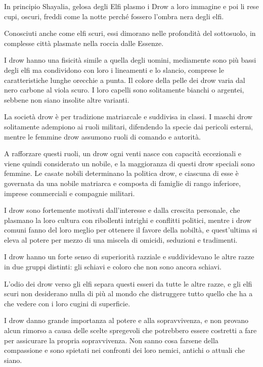 \documentclass[a4paper,11pt,twoside,openany]{book}
\begin{document}
In principio Shayalia, gelosa degli Elfi plasmo i Drow a loro immagine e poi li rese cupi, oscuri, freddi come la notte perché fossero l'ombra nera degli elfi.

Conosciuti anche come elfi scuri, essi dimorano nelle profondità del sottosuolo, in complesse città plasmate nella roccia dalle Essenze.

I drow hanno una fisicità simile a quella degli uomini, mediamente sono più bassi degli elfi ma condividono con loro i lineamenti e lo slancio, comprese le caratteristiche lunghe orecchie a punta. Il colore della pelle dei drow varia dal nero carbone al viola scuro. I loro capelli sono solitamente bianchi o argentei, sebbene non siano insolite altre varianti.

La società drow è per tradizione matriarcale e suddivisa in classi. I maschi drow solitamente adempiono ai ruoli militari, difendendo la specie dai pericoli esterni, mentre le femmine drow assumono ruoli di comando e autorità.

A rafforzare questi ruoli, un drow ogni venti nasce con capacità eccezionali e viene quindi considerato un nobile, e la maggioranza di questi drow speciali sono femmine. Le casate nobili determinano la politica drow, e ciascuna di esse è governata da una nobile matriarca e composta di famiglie di rango inferiore, imprese commerciali e compagnie militari.

I drow sono fortemente motivati dall'interesse e dalla crescita personale, che plasmano la loro cultura con ribollenti intrighi e conflitti politici, mentre i drow comuni fanno del loro meglio per ottenere il favore della nobiltà, e quest'ultima si eleva al potere per mezzo di una miscela di omicidi, seduzioni e tradimenti.

I drow hanno un forte senso di superiorità razziale e suddividevano le altre razze in due gruppi distinti: gli schiavi e coloro che non sono ancora schiavi.

L'odio dei drow verso gli elfi separa questi esseri da tutte le altre razze, e gli elfi scuri non desiderano nulla di più al mondo che distruggere tutto quello che ha a che vedere con i loro cugini di superficie.

I drow danno grande importanza al potere e alla sopravvivenza, e non provano alcun rimorso a causa delle scelte spregevoli che potrebbero essere costretti a fare per assicurare la propria sopravvivenza. Non sanno cosa farsene della compassione e sono spietati nei confronti dei loro nemici, antichi o attuali che siano.
\end{document}
